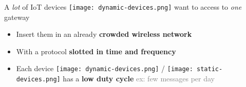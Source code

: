 \begin{frameO}[We want]

    A \emph{lot} of IoT devices \texttt{[image: dynamic-devices.png]} want to access to \emph{one} gateway

    \begin{itemize}
        \item
            Insert them in an already \textbf{crowded wireless network}
        \item
            With a protocol \textbf{slotted in time and frequency}
        \item
            Each device \texttt{[image: dynamic-devices.png]} / \texttt{[image: static-devices.png]} has a \textbf{low duty cycle} \hfill{}
            \textcolor{gray}{ex: few messages per day}
    \end{itemize}

    \pause






\end{frameO}



